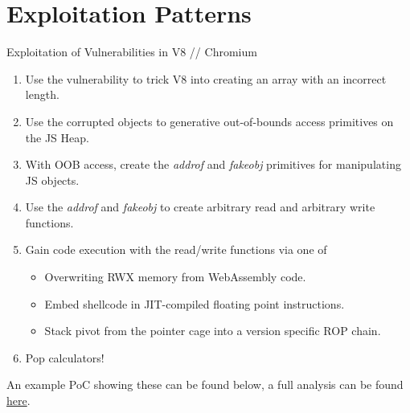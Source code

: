 \section{Exploitation Patterns}
\frame{\sectionpage}

\begin{frame}{Exploitation of Vulnerabilities in V8 // Chromium}
    \begin{enumerate}
        \item Use the vulnerability to trick V8 into creating an array with an incorrect length. 
        \item Use the corrupted objects to generative out-of-bounds access primitives on the JS Heap. 
        \item With OOB access, create the \textit{addrof} and \textit{fakeobj} primitives for manipulating JS objects. 
        \item Use the \textit{addrof} and \textit{fakeobj} to create arbitrary read and arbitrary write functions.
        \item Gain code execution with the read/write functions via one of
            \begin{itemize}
                \item Overwriting RWX memory from WebAssembly code.
                \item Embed shellcode in JIT-compiled floating point instructions.
                \item Stack pivot from the pointer cage into a version specific ROP chain. 
            \end{itemize}
        \item Pop calculators!
    \end{enumerate}
    \break
    An example PoC showing these can be found below, a full analysis can be found \href{https://faraz.faith/2021-01-07-cve-2020-16040-analysis/}{\color{pink}here}.
    \break
    \href{https://www.exploit-db.com/exploits/49745}{\color{pink}{https://www.exploit-db.com/exploits/49745}}
\end{frame}

